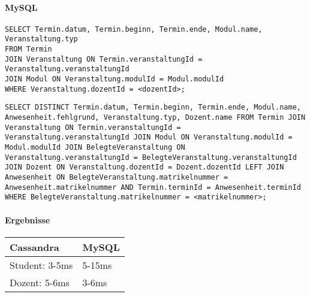 \paragraph{MySQL}
\begin{lstlisting}
SELECT Termin.datum, Termin.beginn, Termin.ende, Modul.name, Veranstaltung.typ
FROM Termin
JOIN Veranstaltung ON Termin.veranstaltungId = Veranstaltung.veranstaltungId
JOIN Modul ON Veranstaltung.modulId = Modul.modulId
WHERE Veranstaltung.dozentId = <dozentId>;
\end{lstlisting} 
\begin{lstlisting}
SELECT DISTINCT Termin.datum, Termin.beginn, Termin.ende, Modul.name, Anwesenheit.fehlgrund, Veranstaltung.typ, Dozent.name FROM Termin JOIN Veranstaltung ON Termin.veranstaltungId = Veranstaltung.veranstaltungId JOIN Modul ON Veranstaltung.modulId = Modul.modulId JOIN BelegteVeranstaltung ON Veranstaltung.veranstaltungId = BelegteVeranstaltung.veranstaltungId JOIN Dozent ON Veranstaltung.dozentId = Dozent.dozentId LEFT JOIN Anwesenheit ON BelegteVeranstaltung.matrikelnummer = Anwesenheit.matrikelnummer AND Termin.terminId = Anwesenheit.terminId WHERE BelegteVeranstaltung.matrikelnummer = <matrikelnummer>; 
\end{lstlisting} 

\vspace{6pt}

\paragraph{Ergebnisse}
\begin{tabular}{|p{5cm}|p{5cm}|}
	\hline
	\textbf{Cassandra} & \textbf{MySQL}\\
	\hline
	Student: 3-5ms & 5-15ms\\
	\hline
	Dozent: 5-6ms & 3-6ms\\
	\hline
\end{tabular}
